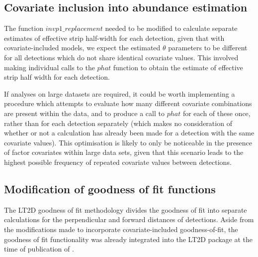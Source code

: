 \documentclass[11pt]{article}
\begin{document}
\begin{multicols}{2}
\subsection{Covariate inclusion into abundance estimation}
The function $invp1\_replacement$ needed to be modified to calculate separate estimates of effective strip half-width for each detection, given that with covariate-included models, we expect the estimated $\theta$ parameters to be different for all detections which do not share identical covariate values. This involved making individual calls to the $phat$ function to obtain the estimate of effective strip half width for each detection.

If analyses on large datasets are required, it could be worth implementing a procedure which attempts to evaluate how many different covariate combinations are present within the data, and to produce a call to $phat$ for each of these once, rather than for each detection separately (which makes no consideration of whether or not a calculation has already been made for a detection with the same covariate values). This optimisation is likely to only be noticeable in the presence of factor covariates within large data sets, given that this scenario leads to the highest possible frequency of repeated covariate values between detections.

\subsection{Modification of goodness of fit functions}
The LT2D goodness of fit methodology divides the goodness of fit into separate calculations for the perpendicular and forward distances of detections. Aside from the modifications made to incorporate covariate-included goodness-of-fit, the goodness of fit functionality was already integrated into the LT2D package at the time of publication of \cite{Borchers}.


\end{multicols}
\end{document}
